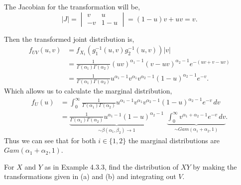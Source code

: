 \documentclass[12pt,letterpaper]{exam}
\begin{document}
\begin{questions}
\begin{solution}
\begin{parts}
			The Jacobian for the transformation will be,
			\[|J| = \begin{vmatrix} v & u \\ -v & 1-u \end{vmatrix} = (1-u)v + uv = v.\]
			
			Then the transformed joint distribution is,
			\begin{align*}
				f_{UV}(u,v) &= f_{X_1}\left(g^{-1}_1(u,v) g^{-1}_2(u,v)\right) |v| \\
				&= \frac{1}{\Gamma(\alpha_1)\Gamma(\alpha_2)} (uv)^{\alpha_1-1} (v-uv)^{\alpha_2-1} e^{-(uv+v-uv)} \\
				&= \frac{1}{\Gamma(\alpha_1)\Gamma(\alpha_2)} u^{\alpha_1-1} v^{\alpha_1} v^{\alpha_2-1} (1-u)^{\alpha_2-1} e^{-v}.
			\end{align*}
			Which allows us to calculate the marginal distribution,			
			\begin{align*}
				f_U(u)
				&= \int_{0}^{\infty}\frac{1}{\Gamma(\alpha_1)\Gamma(\alpha_2)} 
					u^{\alpha_1-1} v^{\alpha_1} v^{\alpha_2-1} (1-u)^{\alpha_2-1} e^{-v} \,dv \\
				&= \underset{\sim\beta(\alpha_1,\beta_2) \rightarrow 1}{
					\underbrace{  \frac{1}{\Gamma(\alpha_1)\Gamma(\alpha_2)} u^{\alpha_1-1} (1-u)^{\alpha_2-1}  }}\ \
					\underset{\sim Gam(\alpha_1+\alpha_2,1)}{
						\underbrace{ \int_{0}^{\infty} v^{\alpha_1+\alpha_2-1}  e^{-v} \,dv }}.
			\end{align*}
			Thus we can see that for both  \(i\in\{1,2\}\) 
			the marginal distributions are \(Gam(\alpha_1+\alpha_2,1)\).
		\end{parts}
	\end{solution}
	\clearpage
	
	\setcounter{question}{22}
	\question 
	For \(X\) and \(Y\) as in Example 4.3.3, find the distribution of \(XY\) by making the transformations given in (a) and (b) and integrating out \(V\).
	
	

\end{questions}
\end{document}
